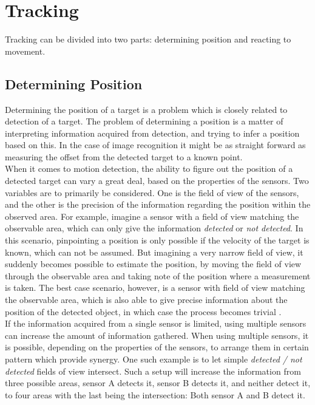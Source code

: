 \section{Tracking}\label{predesign:tracking}
Tracking can be divided into two parts: determining position and reacting to movement.

\subsection{Determining Position}\label{deterpositon}
Determining the position of a target is a problem which is closely related to detection of a target. The problem of determining a position is a matter of interpreting information acquired from detection, and trying to infer a position based on this. In the case of image recognition it might be as straight forward as measuring the offset from the detected target to a known point. \\

When it comes to motion detection, the ability to figure out the position of a detected target can vary a great deal, based on the properties of the sensors. Two variables are to primarily be considered. One is the field of view of the sensors, and the other is the precision of the information regarding the position within the observed area. For example, imagine a sensor with a field of view matching the observable area, which can only give the information \emph{detected} or \emph{not detected}. In this scenario, pinpointing a position is only possible if the velocity of the target is known, which can not be assumed. But imagining a very narrow field of view, it suddenly becomes possible to estimate the position, by moving the field of view through the observable area and taking note of the position where a measurement is taken. The best case scenario, however, is a sensor with field of view matching the observable area, which is also able to give precise information about the position of the detected object, in which case the process becomes trivial \cite{1219468}. \\

If the information acquired from a single sensor is limited, using multiple sensors can increase the amount of information gathered. When using multiple sensors, it is possible, depending on the properties of the sensors, to arrange them in certain pattern which provide synergy. One such example is to let simple \emph{detected / not detected} fields of view intersect. Such a setup will increase the information from three possible areas, sensor A detects it, sensor B detects it, and neither detect it, to four areas with the last being the intersection: Both sensor A and B detect it. \\

